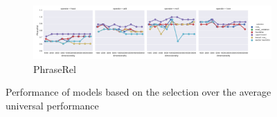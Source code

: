 \begin{figure}
  \begin{subfigure}[t]{\textwidth}
    \includegraphics[width=\textwidth]{supplement/figures/universal-results-PhraseRel}
    \caption{PhraseRel}
    \label{fig:universal-results-phraserel}
  \end{subfigure}


  \caption{Performance of models based on the selection over the average universal performance}
  \label{fig:universal-results}
\end{figure}

